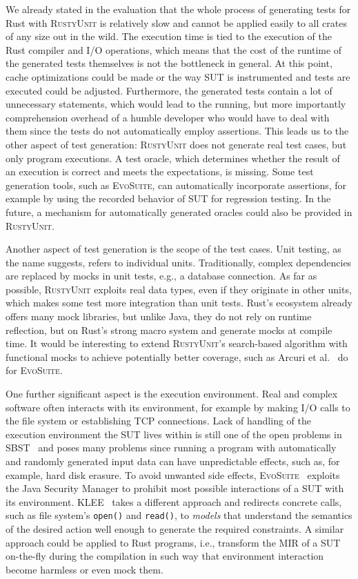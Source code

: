\documentclass[paper=a4,%
  twoside,%
  BCOR4mm,%
  abstract=true,%
  toc=bibliography,%
  chapterprefix=true,%
  toc=bibliographynumbered,%
  open=right,%
  english,%
  pagesize=pdftex]{scrreprt}
\newcommand{\tech}{\textsc{RustyUnit}\xspace}
\newcommand{\mir}{\ac{MIR}\xspace}
\begin{document}
We already stated in the evaluation that the whole process of generating tests for Rust with \tech is relatively slow and cannot be applied easily to all crates of any size out in the wild. The execution time is tied to the execution of the Rust compiler and I/O operations, which means that the cost of the runtime of the generated tests themselves is not the bottleneck in general. At this point, cache optimizations could be made or the way \ac{SUT} is instrumented and tests are executed could be adjusted. Furthermore, the generated tests contain a lot of unnecessary statements, which would lead to the running, but more importantly comprehension overhead of a humble developer who would have to deal with them since the tests do not automatically employ assertions. This leads us to the other aspect of test generation: \tech does not generate real test cases, but only program executions. A test oracle, which determines whether the result of an execution is correct and meets the expectations, is missing. Some test generation tools, such as \textsc{EvoSuite}, can automatically incorporate assertions, for example by using the recorded behavior of \ac{SUT} for regression testing. In the future, a mechanism for automatically generated oracles could also be provided in \tech.

Another aspect of test generation is the scope of the test cases. Unit testing, as the name suggests, refers to individual units. Traditionally, complex dependencies are replaced by mocks in unit tests, e.g., a database connection. As far as possible, \tech exploits real data types, even if they originate in other units, which makes some test more integration than unit tests. Rust's ecosystem already offers many mock libraries, but unlike Java, they do not rely on runtime reflection, but on Rust's strong macro system and generate mocks at compile time. It would be interesting to extend \tech's search-based algorithm with functional mocks to achieve potentially better coverage, such as Arcuri et al.~\cite{Arcuri2017} do for \textsc{EvoSuite}.

One further significant aspect is the execution environment. Real and complex software often interacts with its environment, for example by making I/O calls to the file system or establishing \ac{TCP} connections. Lack of handling of the execution environment the \ac{SUT} lives within is still one of the open problems in \ac{SBST}~\cite{McMinn2011} and poses many problems since running a program with automatically and randomly generated input data can have unpredictable effects, such as, for example, hard disk erasure. To avoid unwanted side effects, \textsc{EvoSuite}~\cite{Fraser2013a} exploits the Java Security Manager to prohibit most possible interactions of a \ac{SUT} with its environment. \textsc{KLEE}~\cite{cadar2008klee} takes a different approach and redirects concrete calls, such as file system's \texttt{open()} and \texttt{read()}, to \emph{models} that understand the semantics of the desired action well enough to generate the required constraints. A similar approach could be applied to Rust programs, i.e., transform the \mir of a \ac{SUT} on-the-fly during the compilation in such way that environment interaction become harmless or even mock them.
\end{document}
